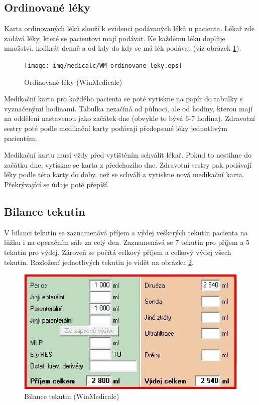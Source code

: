 \subsection{Ordinované léky}

Karta ordinovaných léků slouží k evidenci podávaných léků u pacienta. Lékař zde zadává léky, které se pacientovi mají podávat. Ke každému léku doplňje množství, kolikrát denně a od kdy do kdy se má lék podávat (viz obrázek \ref{fig:WM_ordinovane_leky}).

\begin{figure}[H]
	\centering
	\texttt{[image: img/medicalc/WM\_ordinovane\_leky.eps]}
	\caption{Ordinované léky (WinMedicalc)}
  \label{fig:WM_ordinovane_leky}
\end{figure}

Medikační karta pro každého pacienta se poté vytiskne na papír do tabulky s vyznačenými hodinami. Tabulka nezačíná od půlnoci, ale od hodiny, kterou mají na oddělení nastavenou jako začátek dne (obvykle to bývá 6-7 hodina). Zdravotní sestry poté podle medikační karty podávají předepsané léky jednotlivým pacientům.

Medikační kartu musí vždy před vytištěním schválit lékař. Pokud to nestihne do začátku dne, vytiskne se karta z předchozího dne. Zdravotní sestry pak podávají léky podle této karty do doby, než se schválí a vytiskne nová medikační karta. Překrývající se údaje poté přepíší.

\subsection{Bilance tekutin}

V bilanci tekutin se zaznamenává příjem a výdej veškerých tekutin pacienta na lůžku i na operačním sále za celý den. Zaznamenává se 7 tekutin pro příjem a 5 tekutin pro výdej. Zároveň se počítá celkový příjem a celkový výdej všech tekutin. Rozložení jednotlivých tekutin je vidět na obrázku \ref{fig:WM_bilance_tekutin}.

\begin{figure}[H]
	\centering
	\includegraphics{img/medicalc/WM_bilance_tekutin.eps}
	\caption{Bilance tekutin (WinMedicalc)}
  \label{fig:WM_bilance_tekutin}
\end{figure}


